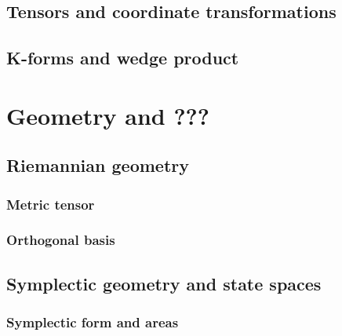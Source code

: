 \documentclass{book}
\begin{document}
\section{Tensors and coordinate transformations}

\section{K-forms and wedge product}

\chapter{Geometry and ???}
\section{Riemannian geometry}
\subsection{Metric tensor}
\subsection{Orthogonal basis}
\section{Symplectic geometry and state spaces}
\subsection{Symplectic form and areas}
\end{document}
